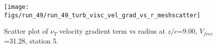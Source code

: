 \begin{figure}[H]
\centering
\texttt{[image: figs/run\_49/run\_49\_turb\_visc\_vel\_grad\_vs\_r\_meshscatter]}
\caption{Scatter plot of $\nu_T$ velocity gradient term vs radius at $z/c$=9.00, $V_{free}$=31.28, station 5.}
\label{fig:run_49_turb_visc_vel_grad_vs_r_meshscatter}
\end{figure}


